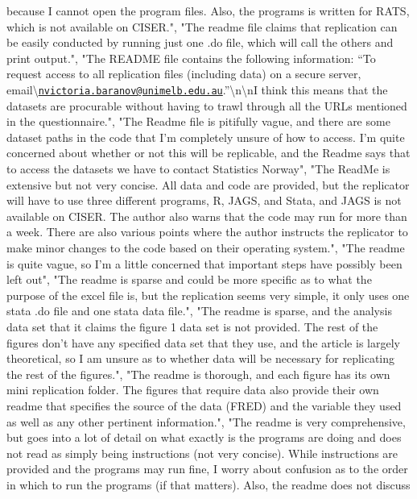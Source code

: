 \documentclass[]{article}
\begin{document}
\begin{itemize}
  because I cannot open the program files. Also, the programs is written
  for RATS, which is not available on CISER.", "The readme file claims
  that replication can be easily conducted by running just one .do file,
  which will call the others and print output.", "The README file
  contains the following information: ``To request access to all
  replication files (including data) on a secure server,
  email\textbackslash{}\href{mailto:nvictoria.baranov@unimelb.edu.au}{\nolinkurl{nvictoria.baranov@unimelb.edu.au}}.''\textbackslash{}n\textbackslash{}nI
  think this means that the datasets are procurable without having to
  trawl through all the URLs mentioned in the questionnaire.", "The
  Readme file is pitifully vague, and there are some dataset paths in
  the code that I'm completely unsure of how to access. I'm quite
  concerned about whether or not this will be replicable, and the Readme
  says that to access the datasets we have to contact Statistics
  Norway", "The ReadMe is extensive but not very concise. All data and
  code are provided, but the replicator will have to use three different
  programs, R, JAGS, and Stata, and JAGS is not available on CISER. The
  author also warns that the code may run for more than a week. There
  are also various points where the author instructs the replicator to
  make minor changes to the code based on their operating system.", "The
  readme is quite vague, so I'm a little concerned that important steps
  have possibly been left out", "The readme is sparse and could be more
  specific as to what the purpose of the excel file is, but the
  replication seems very simple, it only uses one stata .do file and one
  stata data file.", "The readme is sparse, and the analysis data set
  that it claims the figure 1 data set is not provided. The rest of the
  figures don't have any specified data set that they use, and the
  article is largely theoretical, so I am unsure as to whether data will
  be necessary for replicating the rest of the figures.", "The readme is
  thorough, and each figure has its own mini replication folder. The
  figures that require data also provide their own readme that specifies
  the source of the data (FRED) and the variable they used as well as
  any other pertinent information.", "The readme is very comprehensive,
  but goes into a lot of detail on what exactly is the programs are
  doing and does not read as simply being instructions (not very
  concise). While instructions are provided and the programs may run
  fine, I worry about confusion as to the order in which to run the
  programs (if that matters). Also, the readme does not discuss

\end{itemize}
\end{document}
